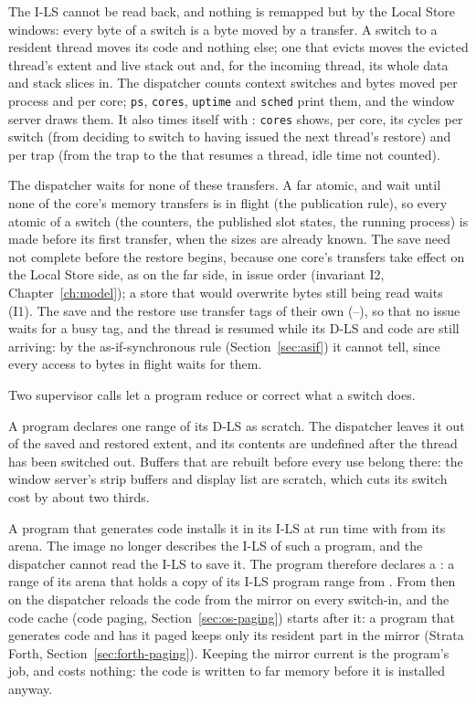 The I-LS cannot be read back, and nothing is remapped but by the Local Store windows: every byte of a
switch is a byte moved by a transfer. A switch to a resident thread moves its code and nothing else;
one that evicts moves the evicted thread's extent and live stack out and, for the incoming thread, its
whole data and stack slices in.
The dispatcher counts context switches and bytes moved per process and per core; \texttt{ps},
\texttt{cores}, \texttt{uptime} and \texttt{sched} print them, and the window server draws them.
It also times itself with : \texttt{cores} shows, per core, its cycles per switch (from
deciding to switch to having issued the next thread's restore) and per trap (from the trap to the
 that resumes a thread, idle time not counted).

The dispatcher waits for none of these transfers. A far atomic,  and  wait until
none of the core's memory transfers is in flight (the publication rule), so every atomic of a switch
(the counters, the published slot states, the running process) is made before its first transfer, when
the sizes are already known. The save need not complete before the restore begins, because one core's
transfers take effect on the Local Store side, as on the far side, in issue order (invariant I2,
Chapter~\ref{ch:model}); a store that would overwrite bytes still being read waits (I1). The save
and the restore use transfer tags of their own (--), so that no issue waits for a
busy tag, and the thread is resumed while its D-LS and code are still arriving: by the
as-if-synchronous rule (Section~\ref{sec:asif}) it cannot tell, since every access to bytes in flight
waits for them.

Two supervisor calls let a program reduce or correct what a switch does.

\begin{description}[leftmargin=1em,style=nextline]
\item[Scratch ranges (SET\_SCRATCH)] A program declares one range of its D-LS as scratch. The dispatcher
  leaves it out of the saved and restored extent, and its contents are undefined after the thread has
  been switched out. Buffers that are rebuilt before every use belong there: the window server's strip
  buffers and display list are scratch, which cuts its switch cost by about two thirds.
\item[Code mirrors (SET\_MIRROR)] A program that generates code installs it in its I-LS at run time
  with  from its arena. The image no longer describes the I-LS of such a program, and the
  dispatcher cannot read the I-LS to save it. The program therefore declares a : a
  range of its arena that holds a copy of its I-LS program range from . From then on the
  dispatcher reloads the code from the mirror on every switch-in, and the code cache (code paging,
  Section~\ref{sec:os-paging}) starts after it: a program that generates code and has it paged keeps
  only its resident part in the mirror (Strata Forth, Section~\ref{sec:forth-paging}). Keeping the
  mirror current is the program's job, and costs nothing: the code is written to far memory before it
  is installed anyway.
\end{description}


